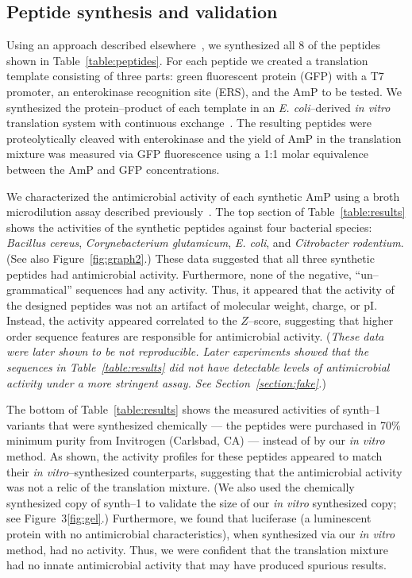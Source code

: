 \subsection{Peptide synthesis and validation}
    Using an approach described elsewhere~\cite{martemyanov2001cell}, we
    synthesized all 8 of the peptides shown in Table~\ref{table:peptides}.
    For each peptide we created a translation template
    consisting of three parts: green fluorescent protein (GFP) with a
    T7 promoter, an enterokinase recognition site (ERS), and the AmP to
    be tested.  We synthesized the protein--product of each template in
    an \emph{E. coli}--derived \emph{in vitro} translation system
    with continuous exchange~\cite{kim1996semicontinuous}.  The resulting
    peptides were proteolytically cleaved with enterokinase and the yield
    of AmP in the translation mixture was measured via GFP fluorescence
    using a 1:1 molar equivalence between the AmP and GFP concentrations.

    We characterized the antimicrobial activity of each
    synthetic AmP using a broth microdilution assay described
    previously~\cite{amsterdam1996susceptibility}.  The top
    section of Table~\ref{table:results} shows the activities of the
    synthetic peptides against four bacterial species: \emph{Bacillus
    cereus}, \emph{Corynebacterium glutamicum}, \emph{E. coli}, and
    \emph{Citrobacter rodentium}.  (See also Figure~\vref{fig:graph2}.)
    These data suggested that all three synthetic peptides
    had antimicrobial activity.  Furthermore, none of the negative,
    ``un--grammatical'' sequences had any activity.  Thus, it appeared that the activity
    of the designed peptides was not an artifact of molecular weight,
    charge, or pI\@.  Instead, the activity appeared correlated to the $Z$--score,
    suggesting that higher order sequence features are responsible for
    antimicrobial activity.  (\emph{These data were later shown to be
    not reproducible.  Later experiments showed that the
    sequences in Table~\ref{table:results} did not have
    detectable levels of antimicrobial
    activity under a more stringent assay. See Section~\vref{section:fake}.})

    The bottom of Table~\ref{table:results} shows the measured activities of
    synth--1 variants that were synthesized chemically --- the peptides
    were purchased in 70\% minimum purity from Invitrogen (Carlsbad, CA)
    --- instead of by our \emph{in vitro} method.  As shown, the activity
    profiles for these peptides appeared to match their \emph{in vitro}--synthesized
    counterparts, suggesting that the antimicrobial activity was not
    a relic of the translation mixture.  (We also used the chemically
    synthesized copy of synth--1 to validate the size of our \emph{in
    vitro} synthesized copy; see Figure~3\ref{fig:gel}.)  Furthermore,
    we found that luciferase (a luminescent protein with no antimicrobial
    characteristics), when synthesized via our \emph{in vitro} method,
    had no activity.  Thus, we were confident that the translation mixture
    had no innate antimicrobial activity that may have produced spurious
    results.

